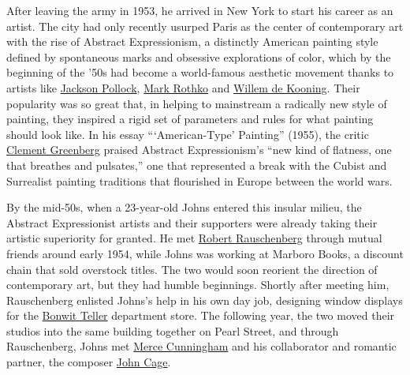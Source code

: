 After leaving the army in 1953, he arrived in New York to start his
career as an artist. The city had only recently usurped Paris as the
center of contemporary art with the rise of Abstract Expressionism, a
distinctly American painting style defined by spontaneous marks and
obsessive explorations of color, which by the beginning of the '50s had
become a world-famous aesthetic movement thanks to artists like
\href{https://www.nytimes.com/topic/person/jackson-pollock}{Jackson
Pollock}, \href{https://www.nytimes.com/topic/person/mark-rothko}{Mark
Rothko} and
\href{https://www.nytimes.com/1997/03/20/arts/willem-de-kooning-dies-at-92-reshaped-us-art.html}{Willem
de Kooning}. Their popularity was so great that, in helping to
mainstream a radically new style of painting, they inspired a rigid set
of parameters and rules for what painting should look like. In his essay
```American-Type' Painting'' (1955), the critic
\href{https://www.nytimes.com/1994/05/08/obituaries/clement-greenberg-dies-at-85-art-critic-championed-pollock.html}{Clement
Greenberg} praised Abstract Expressionism's ``new kind of flatness, one
that breathes and pulsates,'' one that represented a break with the
Cubist and Surrealist painting traditions that flourished in Europe
between the world wars.

By the mid-50s, when a 23-year-old Johns entered this insular milieu,
the Abstract Expressionist artists and their supporters were already
taking their artistic superiority for granted. He met
\href{https://www.nytimes.com/2008/05/14/arts/design/14rauschenberg.html}{Robert
Rauschenberg} through mutual friends around early 1954, while Johns was
working at Marboro Books, a discount chain that sold overstock titles.
The two would soon reorient the direction of contemporary art, but they
had humble beginnings. Shortly after meeting him, Rauschenberg enlisted
Johns's help in his own day job, designing window displays for the
\href{https://www.nytimes.com/2014/10/05/realestate/fifth-avenue-bonwit-teller-opulence-lost.html}{Bonwit
Teller} department store. The following year, the two moved their
studios into the same building together on Pearl Street, and through
Rauschenberg, Johns met
\href{https://www.nytimes.com/topic/person/merce-cunningham}{Merce
Cunningham} and his collaborator and romantic partner, the composer
\href{https://www.nytimes.com/topic/person/john-cage}{John Cage}.

